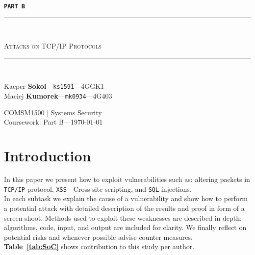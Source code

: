 \documentclass[12pt, a4paper]{article}
\newcommand{\HRule}{\rule{\linewidth}{0.5mm}}
\begin{document}

\begin{center}
\vspace*{\fill}
  \Huge
 \texttt{\textbf{PART B}}

\end{center}


\begin{center}
    \begin{large}
    {\HRule \\[0.2cm]}
    \textsc{Attacks on TCP/IP Protocols}
    {\HRule \\[0.3cm]}
    \end{large}

    \begin{minipage}{ 0.49\textwidth }
        \begin{flushleft}
            Kacper \textbf{Sokol}---\texttt{ks1591}---4GGK1\\
            Maciej \textbf{Kumorek}---\texttt{mk0934}---4G403\\
        \end{flushleft}
    \end{minipage}
    \begin{minipage}{ 0.49\textwidth }
        \begin{flushright}
            {COMSM1500 $|$ Systems Security\\
            Coursework: Part B---\today\\[0.3cm]}
        \end{flushright}
    \end{minipage}
\end{center}
\vspace*{\fill}

\thispagestyle{empty}
\newpage
\setcounter{page}{1}

\section{Introduction}
In this paper we present how to exploit vulnerabilities such as: altering packets in \texttt{TCP/IP} protocol, \texttt{XSS}---Cross-site scripting, and \texttt{SQL} injections.\\
In each subtask we explain the cause of a vulnerability and show how to perform a potential attack with detailed description of the results and proof in form of a screen-shoot. Methods used to exploit these weaknesses are described in depth; algorithms, code, input, and output are included for clarity. We finally reflect on potential risks and whenever possible advise counter measures.\\
\textbf{Table~\ref{tab:SoC}} shows contribution to this study per author.
\end{document}
